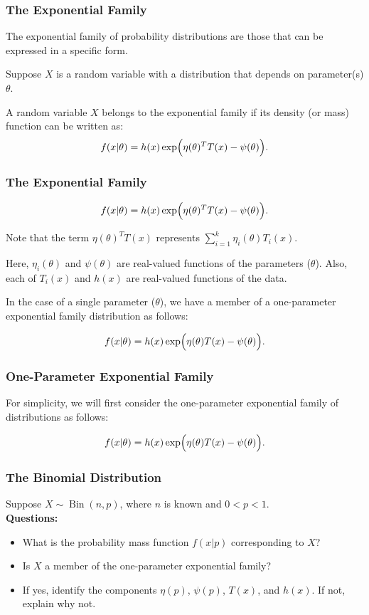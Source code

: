 \documentclass{beamer}
\begin{document}
\begin{frame}
\frametitle{The Exponential Family}
The exponential family of probability distributions are those that
can be expressed in a specific form.

\vspace*{1em}
Suppose $X$ is a random variable with a distribution that depends on parameter(s) $\theta$. 

\vspace*{1em}
A random variable $X$ belongs to the exponential family if its density (or mass) function can be written as:
\[
f(x|\theta) = h(x)\exp\Bigl(\eta(\theta)^T T(x) - \psi(\theta)\Bigr).
\]


\end{frame}




\begin{frame}
\frametitle{The Exponential Family}

\[
f(x|\theta) = h(x)\exp\Bigl(\eta(\theta)^T T(x) - \psi(\theta)\Bigr).
\]

Note that the term $\eta(\theta)^T T(x)$ represents 
$
  \sum_{i=1}^k \eta_i(\theta) T_i(x).
$
\vspace*{1em}

Here, $\eta_i(\theta)$ and $\psi(\theta)$ are real-valued functions of the parameters ($\theta$). 
Also, each of $T_i(x)$ and $h(x)$ are real-valued functions of the data.

\vspace*{1em}

In the case of a single parameter ($\theta$), we have a member of a one-parameter exponential family distribution as follows:

\[
f(x|\theta) = h(x)\exp\Bigl(\eta(\theta) T(x) - \psi(\theta)\Bigr).
\]
\end{frame}

\begin{frame}
\frametitle{One-Parameter Exponential Family}

For simplicity, we will first consider the one-parameter exponential family of distributions as follows:

\[
f(x|\theta) = h(x)\exp\Bigl(\eta(\theta) T(x) - \psi(\theta)\Bigr).
\]
\end{frame}

\begin{frame}
\frametitle{The Binomial Distribution}
Suppose $X \sim \operatorname{Bin}(n,p)$, where $n$ is known and $0 < p < 1$.\\[1em]
\textbf{Questions:}
\begin{itemize}
  \item What is the probability mass function $f(x|p)$ corresponding to $X$?
  \item Is $X$ a member of the one-parameter exponential family?
  \item If yes, identify the components $\eta(p)$, $\psi(p)$, $T(x)$, and $h(x)$. If not, explain why not.
\end{itemize}
\end{frame}
\end{document}

